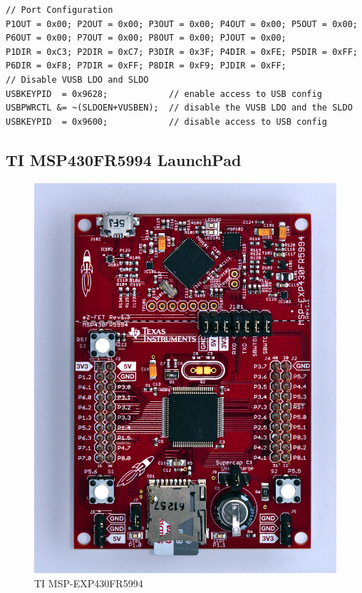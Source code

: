 \documentclass[twoside,11pt]{cergdoc}
\begin{document}
{\small
\begin{lstlisting}
// Port Configuration
P1OUT = 0x00; P2OUT = 0x00; P3OUT = 0x00; P4OUT = 0x00; P5OUT = 0x00;
P6OUT = 0x00; P7OUT = 0x00; P8OUT = 0x00; PJOUT = 0x00;
P1DIR = 0xC3; P2DIR = 0xC7; P3DIR = 0x3F; P4DIR = 0xFE; P5DIR = 0xFF;
P6DIR = 0xF8; P7DIR = 0xFF; P8DIR = 0xF9; PJDIR = 0xFF;
// Disable VUSB LDO and SLDO
USBKEYPID  = 0x9628;            // enable access to USB config
USBPWRCTL &= ~(SLDOEN+VUSBEN);  // disable the VUSB LDO and the SLDO
USBKEYPID  = 0x9600;            // disable access to USB config   
\end{lstlisting}
}


\subsection{TI MSP430FR5994 LaunchPad\texttrademark}

\begin{figure}[ht]
  \begin{center}
    \includegraphics[scale=0.6]{figures/msp-exp430fr5994}
    \caption{TI MSP-EXP430FR5994}\label{fig:5994}
  \end{center}
\vspace{-1ex}
\end{figure}
\end{document}
